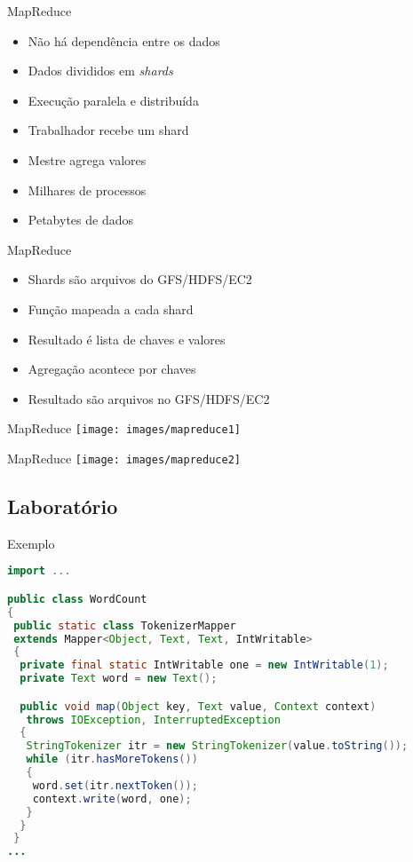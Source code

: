 \begin{frame}{MapReduce}
	\begin{itemize}
		\item Não há dependência entre os dados
		\item Dados divididos em \emph{shards}
		\item Execução paralela e distribuída
		\item Trabalhador recebe um shard
		\item Mestre agrega valores
		\item Milhares de processos
		\item Petabytes de dados
	\end{itemize}
\end{frame}

\begin{frame}{MapReduce}
	\begin{itemize}
		\item Shards são arquivos do GFS/HDFS/EC2
		\item Função mapeada a cada shard
		\item Resultado é lista de chaves e valores
		\item Agregação acontece por chaves
		\item Resultado são arquivos no GFS/HDFS/EC2
	\end{itemize}
\end{frame}

\begin{frame}{MapReduce}
	\texttt{[image: images/mapreduce1]}
\end{frame}

\begin{frame}{MapReduce}
	\texttt{[image: images/mapreduce2]}
\end{frame}


\subsection{Laboratório}

\begin{frame}[fragile]{Exemplo}
\begin{lstlisting}[language=java]
import ...

public class WordCount 
{
 public static class TokenizerMapper 
 extends Mapper<Object, Text, Text, IntWritable>
 {
  private final static IntWritable one = new IntWritable(1);
  private Text word = new Text();

  public void map(Object key, Text value, Context context) 
   throws IOException, InterruptedException 
  {
   StringTokenizer itr = new StringTokenizer(value.toString());
   while (itr.hasMoreTokens()) 
   {
    word.set(itr.nextToken());
    context.write(word, one);
   }
  } 
 }
...
\end{lstlisting}
\end{frame}

